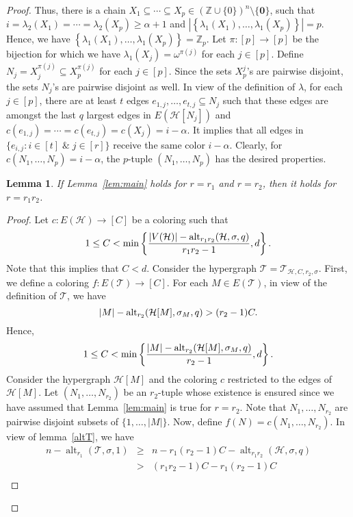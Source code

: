 \documentclass[11pt]{amsart}
\newtheorem{lemma}{Lemma}
\theoremstyle{definition}
\theoremstyle{remark}
\def\Z{\mathbb{Z}}
\def\T{\mathsf{T}}
\def\zero{\boldsymbol{0}}
\def\alt{\operatorname{alt}}
\def\T{\mathcal{T}}
\begin{document}
\begin{proof}
Thus, there is a chain $X_1\subseteq\cdots \subseteq X_p\in (\mathbb{Z}\cup\{0\})^n\setminus\{\zero\}$,
      such that  $i=\lambda_2(X_1)=\cdots=\lambda_2(X_p)\geq\alpha+1$ and  
$\left|\left\{\lambda_1(X_1),\ldots,\lambda_1(X_p)\right\}\right|=p.$ 
Hence, we have $\left\{\lambda_1(X_1),\ldots,\lambda_1(X_p)\right\}=\Z_p$.
Let $\pi:[p]\longrightarrow [p]$ be the bijection for which we have 
$\lambda_1(X_j)=\omega^{\pi(j)}$ for each $j\in[p]$.  
Define $N_j=X_j^{\pi(j)}\subseteq X_p^{\pi(j)}$
for each $j\in[p]$. Since  
the sets $X_p^j$'s are pairwise disjoint, the sets $N_j$'s are pairwise disjoint as well. 
In view of the definition of $\lambda$, for each $j\in[p]$, there are at least $t$ 
edges $e_{1,j},\ldots,e_{t,j}\subseteq N_j$ such that 
these edges are amongst the last $q$ largest edges in $E(\mathcal{H}[N_j])$ and 
$c(e_{1,j})=\cdots=c(e_{t,j})=c(X_j)=i-\alpha$. It implies that all edges in $\{e_{i,j}:i\in[t]\;\&\; j\in[r]\}$ receive the same color $i-\alpha$. Clearly, for $c(N_1,\ldots,N_p)=i-\alpha$, the $p$-tuple $(N_1,\ldots,N_p)$ has the desired properties. 
\begin{lemma}\label{reduction}
If Lemma~{\rm\ref{lem:main}} holds for $r=r_1$ and $r=r_2$, then it holds for $r=r_1r_2$.
\end{lemma}
\begin{proof}
Let $c:E(\mathcal{H})\longrightarrow [C]$ be a coloring such that 
$$1\leq C<\min\left\{{|V(\mathcal{H})|-{\rm alt}_{r_1r_2}(\mathcal{H},\sigma,q)\over r_1r_2-1},d\right\}.$$
Note that this implies that $C<d$. 
Consider the hypergraph $\T=\T_{\mathcal{H},C,r_2,\sigma}$. First,
we define a coloring $f:E(\T)\longrightarrow [C]$.
For each $M\in E(\T)$, in view of the definition of $\T$, we have 
$$|M|-{\rm alt}_{r_2}(\mathcal{H}[M],\sigma_M,q) > (r_2-1)C.$$
Hence, 
$$1\leq C<\min\left\{{|M|-{\rm alt}_{r_2}(\mathcal{H}[M],\sigma_M,q)\over r_2-1},d\right\}.$$
Consider the hypergraph $\mathcal{H}[M]$ and the coloring $c$ restricted to the edges of $\mathcal{H}[M]$. 
Let $(N_1,\ldots,N_{r_2})$ be an 
$r_2$-tuple whose existence is ensured since we have assumed that Lemma~\ref{lem:main} is true for $r=r_2$.
Note that $N_1,\ldots,N_{r_2}$ are pairwise disjoint subsets of $\{1,\ldots,|M|\}$.
Now, define $f(N)=c(N_1,\ldots,N_{r_2})$.
In view of lemma~\ref{altT}, we have
$$\begin{array}{lll}
n-\alt_{r_1}(\T,\sigma,1) & \geq & n-r_1(r_2-1)C-\alt_{r_1r_2}(\mathcal{H},\sigma,q)\\
			       &    >   & (r_1r_2-1)C-r_1(r_2-1)C\\

\end{array}$$
\end{proof}
\end{proof}
\end{document}

